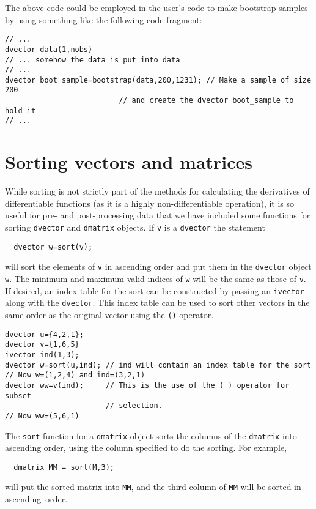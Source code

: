 \documentclass{admbmanual}
\begin{document}
The above code could be employed in the user's code to make bootstrap samples by
using something like the following code fragment:
\begin{lstlisting}
// ...
dvector data(1,nobs)
// ... somehow the data is put into data
// ...
dvector boot_sample=bootstrap(data,200,1231); // Make a sample of size 200
                          // and create the dvector boot_sample to hold it
// ...
\end{lstlisting}

\section{Sorting vectors and matrices}

While sorting is not strictly part of the methods for calculating the
derivatives of differentiable functions (as it is a highly non-differentiable
operation), it is so useful for pre- and post-processing data that we have
included some functions for sorting \texttt{dvector} and \texttt{dmatrix}
objects. If \texttt{v} is a \texttt{dvector} the statement
\begin{lstlisting}
  dvector w=sort(v);
\end{lstlisting}
will sort the elements of \texttt{v} in ascending order and put them in the
\texttt{dvector} object \texttt{w}. The minimum and maximum valid indices of
\texttt{w} will be the same as those of \texttt{v}. If desired, an index table
for the sort can be constructed by passing an \texttt{ivector} along with the
\texttt{dvector}. This index table can be used to sort other vectors in the same
order as the original vector using the \texttt{()} operator.
\begin{lstlisting}
dvector u={4,2,1};
dvector v={1,6,5}
ivector ind(1,3);
dvector w=sort(u,ind); // ind will contain an index table for the sort
// Now w=(1,2,4) and ind=(3,2,1)
dvector ww=v(ind);     // This is the use of the ( ) operator for subset
                       // selection.
// Now ww=(5,6,1)
\end{lstlisting}

The \texttt{sort} function for a \texttt{dmatrix} object sorts the columns of
the \texttt{dmatrix} into ascending order, using the column specified to do the
sorting. For example,
\begin{lstlisting}
  dmatrix MM = sort(M,3);
\end{lstlisting}
will put the sorted matrix into \texttt{MM}, and the third column of \texttt{MM}
will be sorted in ascending~\mbox{order}.
\end{document}
